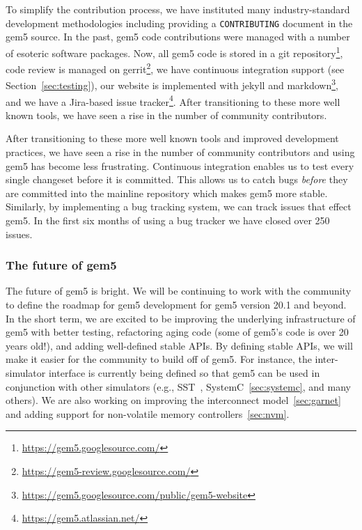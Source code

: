 To simplify the contribution process, we have instituted many industry-standard development methodologies including providing a \verb|CONTRIBUTING| document in the gem5 source.
In the past, gem5 code contributions were managed with a number of esoteric software packages.
Now, all gem5 code is stored in a git repository\footnote{\url{https://gem5.googlesource.com/}}, code review is managed on gerrit\footnote{\url{https://gem5-review.googlesource.com/}}, we have continuous integration support (see Section~\ref{sec:testing}), our website is implemented with jekyll and markdown\footnote{\url{https://gem5.googlesource.com/public/gem5-website}}, and we have a Jira-based issue tracker\footnote{\url{https://gem5.atlassian.net/}}.
After transitioning to these more well known tools, we have seen a rise in the number of community contributors.

After transitioning to these more well known tools and improved development practices, we have seen a rise in the number of community contributors and using gem5 has become less frustrating.
Continuous integration enables us to test every single changeset before it is committed.
This allows us to catch bugs \emph{before} they are committed into the mainline repository which makes gem5 more stable.
Similarly, by implementing a bug tracking system, we can track issues that effect gem5.
In the first six months of using a bug tracker we have closed over 250 issues.

\subsubsection*{The future of gem5}
The future of gem5 is bright.
We will be continuing to work with the community to define the roadmap for gem5 development for gem5 version 20.1 and beyond.
In the short term, we are excited to be improving the underlying infrastructure of gem5 with better testing, refactoring aging code (some of gem5's code is over 20 years old!), and adding well-defined stable APIs.
By defining stable APIs, we will make it easier for the community to build off of gem5.
For instance, the inter-simulator interface is currently being defined so that gem5 can be used in conjunction with other simulators (e.g., SST~\cite{}, SystemC~\ref{sec:systemc}, and many others).
We are also working on improving the interconnect model~\ref{sec:garnet} and adding support for non-volatile memory controllers~\ref{sec:nvm}.

